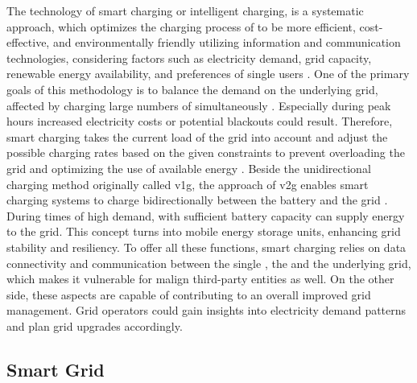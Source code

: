 The technology of smart charging or intelligent charging, is a systematic approach, which optimizes the charging process of   to be more efficient, cost-effective, and environmentally friendly utilizing information and communication technologies, considering factors such as electricity demand, grid capacity, renewable energy availability, and preferences of single users \cite{deb_smart_2022}.
One of the primary goals of this methodology is to balance the demand on the underlying grid, affected by charging large numbers of  simultaneously \cite{daina_electric_2017}. Especially during peak hours increased electricity costs or potential blackouts could result. 
Therefore, smart charging takes the current load of the grid into account and adjust the possible charging rates based on the given constraints to prevent overloading the grid and optimizing the use of available energy \cite{garcia-villalobos_plug-electric_2014}. 
Beside the unidirectional charging method originally called \acrfull{v1g}, the approach of \acrfull{v2g} enables smart charging systems to charge bidirectionally between the  battery and the grid \cite[199]{kathiresh_e-mobility_2022}. During times of high demand,  with sufficient battery capacity can supply energy to the grid. This concept turns  into mobile energy storage units, enhancing grid stability and resiliency.
To offer all these functions, smart charging relies on data connectivity and communication between the single , the  and the underlying grid, which makes it vulnerable for malign third-party entities as well. On the other side, these aspects are capable of contributing to an overall improved grid management. Grid operators could gain insights into electricity demand patterns and plan grid upgrades accordingly.

\subsection{Smart Grid}
\label{ch:Fundamentals:sec:Electric Mobility:ssec:Smart Grid}

